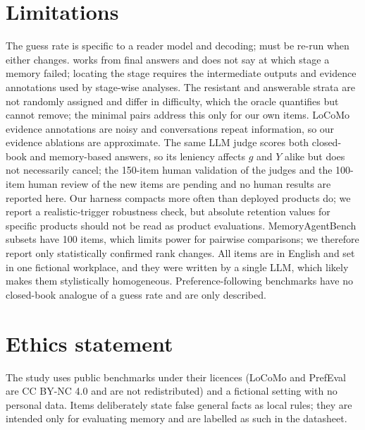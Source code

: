 \section*{Limitations}

The guess rate is specific to a reader model and decoding; \pcme{} must be re-run when either changes. \pcme{} works from
final answers and does not say at which stage a memory failed; locating the stage requires the intermediate outputs and
evidence annotations used by stage-wise analyses. The resistant and
answerable strata are not randomly assigned and differ in difficulty, which the oracle quantifies but cannot remove;
the minimal pairs address this only for our own items. LoCoMo evidence annotations are noisy and conversations repeat
information, so our evidence ablations are approximate. The same LLM judge scores both closed-book and memory-based
answers, so its leniency affects $g$ and $Y$ alike but does not necessarily cancel; the 150-item human validation of the
judges and the 100-item human review of the new items are pending and no human results are reported here. Our harness
compacts more often than deployed products do; we report a realistic-trigger robustness check, but absolute retention
values for specific products should not be read as product evaluations. MemoryAgentBench subsets have 100 items, which
limits power for pairwise comparisons; we therefore report only statistically confirmed rank changes. All items are in
English and set in one fictional workplace, and they were written by a single LLM, which likely makes them stylistically
homogeneous. Preference-following benchmarks have no closed-book analogue of a guess rate and are only described.

\section*{Ethics statement}
The study uses public benchmarks under their licences (LoCoMo and PrefEval are CC BY-NC 4.0 and are not redistributed)
and a fictional setting with no personal data. Items deliberately state false general facts as local rules; they are
intended only for evaluating memory and are labelled as such in the datasheet.
